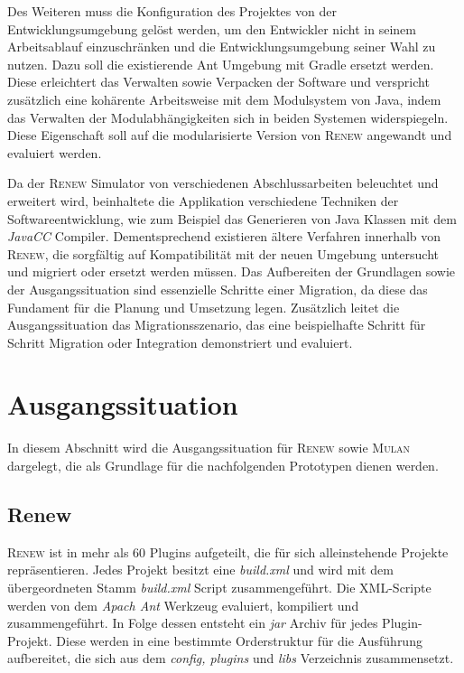 	Des Weiteren muss die Konfiguration des Projektes von der Entwicklungsumgebung gelöst werden, um den Entwickler nicht in seinem Arbeitsablauf einzuschränken und die Entwicklungsumgebung seiner Wahl zu nutzen. Dazu soll die existierende Ant Umgebung mit Gradle ersetzt werden. Diese erleichtert das Verwalten sowie Verpacken der Software und verspricht zusätzlich eine kohärente Arbeitsweise mit dem Modulsystem von Java, indem das Verwalten der Modulabhängigkeiten sich in beiden Systemen widerspiegeln. Diese Eigenschaft soll auf die modularisierte Version von \textsc{Renew} angewandt und evaluiert werden. \bigbreak

	Da der \textsc{Renew} Simulator von verschiedenen Abschlussarbeiten beleuchtet und erweitert wird, beinhaltete die Applikation verschiedene Techniken der Softwareentwicklung, wie zum Beispiel das Generieren von Java Klassen mit dem \textit{JavaCC} Compiler. Dementsprechend existieren ältere Verfahren innerhalb von \textsc{Renew}, die sorgfältig auf Kompatibilität mit der neuen Umgebung untersucht und migriert oder ersetzt werden müssen. \bigbreak
	Das Aufbereiten der Grundlagen sowie der Ausgangssituation sind essenzielle Schritte einer Migration, da diese das Fundament für die Planung und Umsetzung legen. Zusätzlich leitet die Ausgangssituation das Migrationsszenario, das eine beispielhafte Schritt für Schritt Migration oder Integration demonstriert und evaluiert.\bigbreak

\section{Ausgangssituation} \label{sec:ausgangssituation} 
	In diesem Abschnitt wird die Ausgangssituation für \textsc{Renew} sowie \textsc{Mulan} dargelegt, die als Grundlage für die nachfolgenden Prototypen dienen werden. 

	\subsection{Renew} \label{sub:renew}
		\textsc{Renew} ist in mehr als 60 Plugins aufgeteilt, die für sich alleinstehende Projekte repräsentieren. Jedes Projekt besitzt eine \textit{build.xml} und wird mit dem übergeordneten Stamm \textit{build.xml} Script zusammengeführt. Die XML-Scripte werden von dem \textit{Apach Ant} Werkzeug evaluiert, kompiliert und zusammengeführt. In Folge dessen entsteht ein \textit{jar} Archiv für jedes Plugin-Projekt. Diese werden in eine bestimmte Orderstruktur für die Ausführung aufbereitet, die sich aus dem \textit{config, plugins} und \textit{libs} Verzeichnis zusammensetzt. \bigbreak

